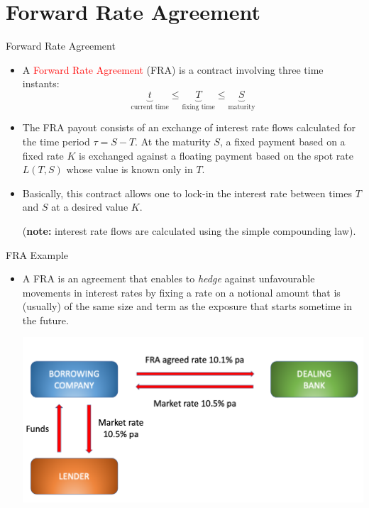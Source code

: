 \documentclass{beamer}
\begin{document}
\section{Forward Rate Agreement}
\begin{frame}{Forward Rate Agreement}
	\begin{itemize}	
		\item<1-> A \textcolor{red}{Forward Rate Agreement} (FRA) is a contract involving three time instants: %
		\begin{equation*}
			\underbrace{t}_{\text{current time}} \leq \underbrace{T}_{\text{fixing time}} \leq\underbrace{S}_{\text{maturity}}
		\end{equation*}
		\item<2-> The FRA payout consists of an exchange of interest rate flows calculated for the time period $\tau=S-T$. At the maturity $S$, a fixed payment based on a fixed rate $K$ is exchanged against a floating payment based on the spot rate $L(T, S)$ whose value is known only in $T$.
		\item<3-> Basically, this contract allows one to lock-in the interest rate between times $T$ and $S$ at a desired value $K$.
		 
		\noindent
		(\textbf{note:} interest rate flows are calculated using the simple compounding law).
	\end{itemize}
\end{frame}

\begin{frame}{FRA Example}
	\begin{itemize}
	\item A FRA is an agreement that enables to \emph{hedge} against unfavourable movements in interest rates by fixing a rate on a notional amount that is (usually) of the same size and term as the exposure that starts sometime in the future. 
	\vfill
	\begin{center}
		\includegraphics[width=0.9\linewidth]{FRA_diagram}
	\end{center}
	\end{itemize}
\end{frame}
\end{document}
